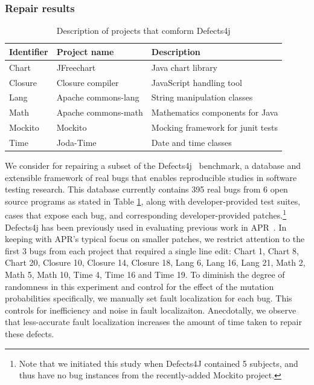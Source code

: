\documentclass[conference]{IEEEtran}
\begin{document}
\subsubsection{Repair results}


\begin{table}[ht]
\centering
\begin{tabular}{lll}
\hline
Identifier & Project name & Description\\
\hline
Chart & JFreechart & Java chart library \\
Closure	& Closure compiler	 & JavaScript handling tool\\
Lang	& Apache commons-lang & String manipulation classes\\
Math	& Apache commons-math & Mathematics components for Java \\
Mockito &	Mockito	 & Mocking framework for junit tests \\
Time	& Joda-Time & Date and time classes \\
\hline
\end{tabular}
\newline
\center
  \caption{Description of projects that comform Defects4j}
  \label{defects4j}
\end{table} 

We consider for repairing a subset of the Defects4j~\cite{just14}
benchmark, a database and extensible 
framework of real bugs that enables reproducible studies in software testing 
research. This database currently contains 395 real bugs from 6
open source programs as stated in Table \ref{defects4j}, along with developer-provided test suites, cases that
expose each bug,  and
corresponding developer-provided patches.\footnote{Note that we initiated this study when Defects4J
  contained 5 subjects, and thus have no bug instances from the recently-added
  Mockito project.} Defects4j has been previously used
in evaluating previous work in APR~\cite{Durieux15}.
In keeping with APR's typical focus on smaller patches, we
restrict attention to the first 3 bugs from each project that required a 
single line edit: Chart 1, 
Chart 8, Chart 20, Closure 10, Closure 14, Closure 18, Lang 6, Lang 16, Lang 21, 
Math 2, Math 5, Math 10, Time 4, Time 16 and Time 19.
To diminish the degree of randomness in this experiment and control for the
effect of the mutation probabilities specifically,  we manually
set fault localization for each bug.  This controls for inefficiency and noise
in fault localizaiton. Anecdotally, we observe that less-accurate fault localization increases the amount of
time taken to repair these defects. 
\end{document}
